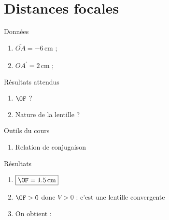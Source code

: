 \documentclass[../main/main.tex]{subfiles}
\begin{document}
\section{Distances focales}
\begin{tcbraster}[raster columns=4, raster equal height=rows]
    \begin{tcolorbox}[blankest, raster multicolumn=1, space to=\myspace]
        \begin{tcbraster}[raster columns=1]
            \begin{NCdefi}{Données}
            	\begin{enumerate}
            		\item $\overline{OA} = -6\,$cm ;
            		\item $\overline{OA^\prime} = 2\,$cm ;
            	\end{enumerate}
            \end{NCdefi}
            
            \begin{NCprop}{Résultats attendus}
            	\begin{enumerate}
            		\item $\OF$ ?
            		\item Nature de la lentille ?
            	\end{enumerate}
            \end{NCprop}
            
            \begin{NCdemo}[add to natural height=\myspace]{Outils du cours}
            	\begin{enumerate}
            		\item Relation de conjugaison
            	\end{enumerate} 
            \end{NCdemo}
        \end{tcbraster}
    \end{tcolorbox}
    \begin{NCexem}[raster multicolumn=3]{Résultats}
    	\begin{enumerate}
    		\item $\boxed{\OF = 1.5\,{\rm cm}}$
            \item $\OF > 0$ donc $V>0$ : c'est une lentille convergente
    		\item On obtient :
                \begin{center}
\end{center}
\end{enumerate}
\end{NCexem}
\end{tcbraster}
\end{document}
